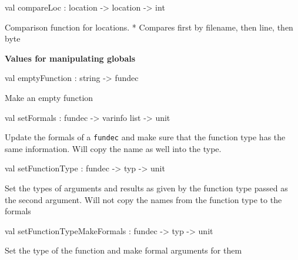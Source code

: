 \documentclass[11pt]{article}
\begin{document}
\label{val:Cil.compareLoc}\begin{ocamldoccode}
val compareLoc : location -> location -> int
\end{ocamldoccode}
\begin{ocamldocdescription}
Comparison function for locations.
* Compares first by filename, then line, then byte


\end{ocamldocdescription}




{\bf Values for manipulating globals}



\label{val:Cil.emptyFunction}\begin{ocamldoccode}
val emptyFunction : string -> fundec
\end{ocamldoccode}
\begin{ocamldocdescription}
Make an empty function


\end{ocamldocdescription}




\label{val:Cil.setFormals}\begin{ocamldoccode}
val setFormals : fundec -> varinfo list -> unit
\end{ocamldoccode}
\begin{ocamldocdescription}
Update the formals of a {\tt{fundec}} and make sure that the function type 
    has the same information. Will copy the name as well into the type.


\end{ocamldocdescription}




\label{val:Cil.setFunctionType}\begin{ocamldoccode}
val setFunctionType : fundec -> typ -> unit
\end{ocamldoccode}
\begin{ocamldocdescription}
Set the types of arguments and results as given by the function type 
 passed as the second argument. Will not copy the names from the function 
 type to the formals


\end{ocamldocdescription}




\label{val:Cil.setFunctionTypeMakeFormals}\begin{ocamldoccode}
val setFunctionTypeMakeFormals : fundec -> typ -> unit
\end{ocamldoccode}
\begin{ocamldocdescription}
Set the type of the function and make formal arguments for them


\end{ocamldocdescription}
\end{document}
